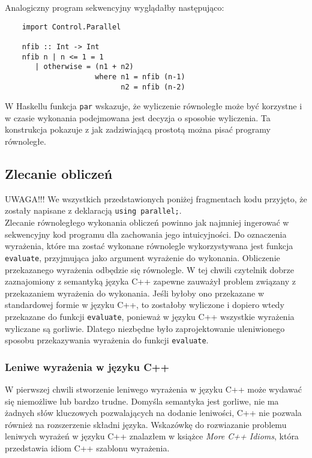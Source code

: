   Analogiczny program sekwencyjny wyglądałby następująco:
  \begin{verbatim}
    import Control.Parallel

    nfib :: Int -> Int
    nfib n | n <= 1 = 1
       | otherwise = (n1 + n2)
                     where n1 = nfib (n-1)
                           n2 = nfib (n-2)
  \end{verbatim}
  
  W Haskellu funkcja \verb|par| wskazuje, że wyliczenie równoległe może być korzystne i w czasie wykonania podejmowana jest decyzja o sposobie wyliczenia.
  Ta konstrukcja pokazuje z jak zadziwiającą prostotą można pisać programy równoległe.
  
\subsection{Zlecanie obliczeń}

  UWAGA!!! We wszystkich przedstawionych poniżej fragmentach kodu przyjęto, że zostały napisane z deklaracją \verb|using parallel;|.\\

  Zlecanie równoległego wykonania obliczeń powinno jak najmniej ingerować w sekwencyjny kod programu dla zachowania jego intuicyjności.
  Do oznaczenia wyrażenia, które ma zostać wykonane równolegle wykorzystywana jest funkcja \verb|evaluate|, przyjmująca jako argument wyrażenie do wykonania.
  Obliczenie przekazanego wyrażenia odbędzie się równolegle.
  W tej chwili czytelnik dobrze zaznajomiony z semantyką języka C++ zapewne zauważył problem związany z przekazaniem wyrażenia do wykonania.
  Jeśli byłoby ono przekazane w standardowej formie w języku C++, to zostałoby wyliczone i dopiero wtedy przekazane do funkcji \verb|evaluate|, ponieważ w języku C++ wszystkie wyrażenia wyliczane są gorliwie.
  Dlatego niezbędne było zaprojektowanie uleniwionego sposobu przekazywania wyrażenia do funkcji \verb|evaluate|.
  
\subsubsection{Leniwe wyrażenia w języku C++}

  W pierwszej chwili stworzenie leniwego wyrażenia w języku C++ może wydawać się niemożliwe lub bardzo trudne. 
  Domyśla semantyka jest gorliwe, nie ma żadnych słów kluczowych pozwalających na dodanie leniwości, C++ nie pozwala również na rozszerzenie składni języka.
  Wskazówkę do rozwiazanie problemu leniwych wyrażeń w języku C++ znalazłem w książce \textit{More C++ Idioms}\cite{idioms}, która przedstawia idiom C++ szablonu wyrażenia.
  
